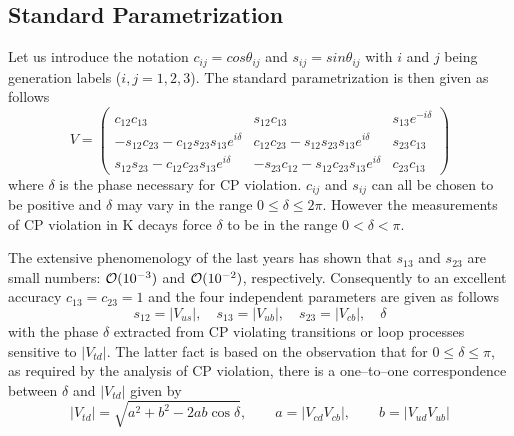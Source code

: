 \subsection{Standard Parametrization}
            \label{sec:sewm:stdparam}
Let us introduce the notation
$c_{ij}=cos\theta_{ij}$ and $s_{ij}=sin\theta_{ij}$ with $i$ and $j$
being generation labels ($i,j=1,2,3$). The standard parametrization is
then given as follows \cite{particledata:94}
\begin{equation}\label{2.72}
V=
\left(\begin{array}{ccc}
c_{12}c_{13}&s_{12}c_{13}&s_{13}e^{-i\delta}\\ -s_{12}c_{23}
-c_{12}s_{23}s_{13}e^{i\delta}&c_{12}c_{23}-s_{12}s_{23}s_{13}e^{i\delta}&
s_{23}c_{13}\\ s_{12}s_{23}-c_{12}c_{23}s_{13}e^{i\delta}&-s_{23}c_{12}
-s_{12}c_{23}s_{13}e^{i\delta}&c_{23}c_{13}
\end{array}\right)
\end{equation}
where $\delta$ is the phase necessary for CP violation. $c_{ij}$ and
$s_{ij}$ can all be chosen to be positive and $\delta$ may vary in the
range $0\le\delta\le 2\pi$. However the measurements
of CP violation in K decays force $\delta$ to be in the range
 $0<\delta<\pi$. 

The extensive phenomenology of the last years 
has shown that
$s_{13}$ and $s_{23}$ are small numbers: ${\cal O}(10^{-3})$ and ${\cal
O}(10^{-2})$,
respectively. Consequently to an excellent accuracy $c_{13}=c_{23}=1$
and the four independent parameters are given as follows
\begin{equation}\label{2.73}
s_{12}=| V_{us}|, \quad s_{13}=| V_{ub}|, \quad s_{23}=|
V_{cb}|, \quad \delta
\end{equation}
with the phase $\delta$ extracted from CP violating transitions or 
loop processes sensitive to $| V_{td}|$. The latter fact is based
on the observation that
 for $0\le\delta\le\pi$, as required by the analysis of CP violation,
there is a one--to--one correspondence between $\delta$ and $|V_{td}|$
given by
\begin{equation}\label{10}
| V_{td}|=\sqrt{a^2+b^2-2 a b \cos\delta},
\qquad
a=| V_{cd} V_{cb}|,
\qquad
b=| V_{ud} V_{ub}|
\end{equation} 


